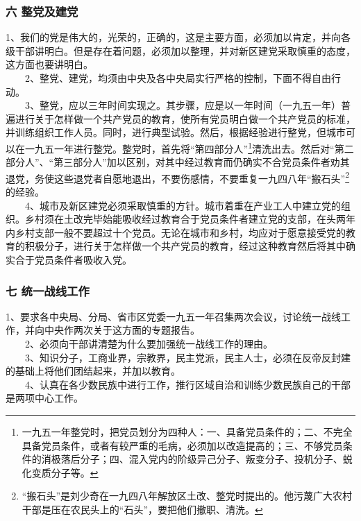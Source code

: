 \documentclass[cn,11pt,chinese]{elegantbook}
\def\myformat#1{\hfil\hfil #1}
\begin{document}
\subsubsection*{\myformat{六 整党及建党}}
1、我们的党是伟大的，光荣的，正确的，这是主要方面，必须加以肯定，并向各级干部讲明白。但是存在着问题，必须加以整理，并对新区建党采取慎重的态度，这方面也要讲明白。\\
　　2、整党、建党，均须由中央及各中央局实行严格的控制，下面不得自由行动。\\
　　3、整党，应以三年时间实现之。其步骤，应是以一年时间（一九五一年）普遍进行关于怎样做一个共产党员的教育，使所有党员明白做一个共产党员的标准，并训练组织工作人员。同时，进行典型试验。然后，根据经验进行整党，但城市可以在一九五一年进行整党。整党时，首先将“第四部分人”\footnote[2]{一九五一年整党时，把党员划分为四种人：一、具备党员条件的；二、不完全具备党员条件，或者有较严重的毛病，必须加以改造提高的；三、不够党员条件的消极落后分子；四、混入党内的阶级异己分子、叛变分子、投机分子、蜕化变质分子等。}清洗出去。然后对“第二部分人”、“第三部分人”加以区别，对其中经过教育而仍确实不合党员条件者劝其退党，务使这些退党者自愿地退出，不要伤感情，不要重复一九四八年“搬石头”\footnote[3]{“搬石头”是刘少奇在一九四八年解放区土改、整党时提出的。他污蔑广大农村干部是压在农民头上的“石头”，要把他们撤职、清洗。}的经验。\\
　　4、城市及新区建党必须采取慎重的方针。城市着重在产业工人中建立党的组织。乡村须在土改完毕始能吸收经过教育合于党员条件者建立党的支部，在头两年内乡村支部一般不要超过十个党员。无论在城市和乡村，均应对于愿意接受党的教育的积极分子，进行关于怎样做一个共产党员的教育，经过这种教育然后将其中确实合于党员条件者吸收入党。\\
\subsubsection*{\myformat{七 统一战线工作}}
1、要求各中央局、分局、省市区党委一九五一年召集两次会议，讨论统一战线工作，并向中央作两次关于这方面的专题报告。\\
　　2、必须向干部讲清楚为什么要加强统一战线工作的理由。\\
　　3、知识分子，工商业界，宗教界，民主党派，民主人士，必须在反帝反封建的基础上将他们团结起来，并加以教育。\\
　　4、认真在各少数民族中进行工作，推行区域自治和训练少数民族自己的干部是两项中心工作。\\
\end{document}
